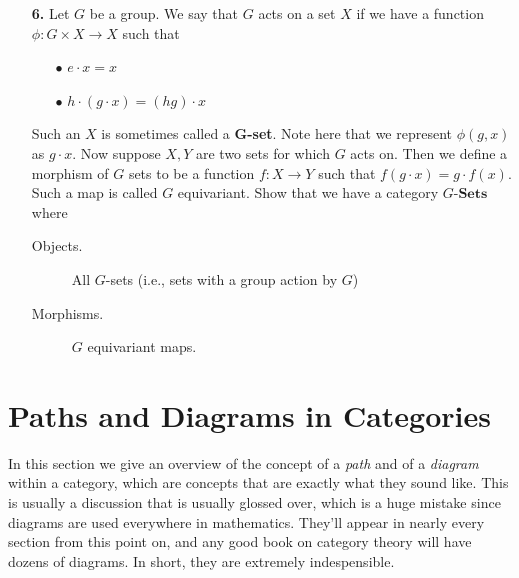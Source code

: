 \begin{itemize}
        \item[\textbf{6.}]
        Let $G$ be a group. We say that $G$ acts on a set $X$ if we have a 
        function $\phi: G \times X \to X$ such that 
        \begin{itemize}
            \item[$\bullet$] $e \cdot x = x$
            \item[$\bullet$] $h\cdot (g \cdot x) = (hg)\cdot x$
        \end{itemize}
        Such an $X$ is sometimes called a \textbf{G-set}.
        Note here that we represent $\phi(g, x)$ as $g \cdot x$. Now suppose $X, Y$ are 
        two sets for which $G$ acts on. Then we define a morphism of $G$ sets to be a 
        function $f: X \to Y$ such that $f(g \cdot x) = g \cdot f(x)$. Such a map is called 
        $G$ equivariant. Show that we have 
        a category $G\textbf{-Sets}$ where 
        \begin{description}
            \item[Objects.] All $G$-sets (i.e., sets with a group action by $G$)
            \item[Morphisms.] $G$ equivariant maps. 
        \end{description}
    \end{itemize}

    \newpage
    \section{Paths and Diagrams in Categories}
    In this section we give an overview of the concept of a \emph{path} and 
    of a \emph{diagram} within a category, which are concepts that are exactly 
    what they sound like. 
    This is usually a discussion that is usually glossed over,
    which is a huge mistake since diagrams are used everywhere in mathematics. 
    They'll appear in nearly every section from this point on, and any good book 
    on category theory will have dozens of diagrams. In short, they 
    are extremely indespensible. 


